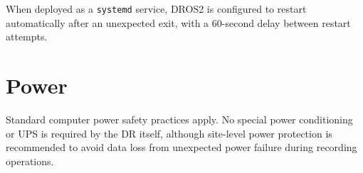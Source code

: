 When deployed as a \texttt{systemd} service, DROS2 is configured to restart
automatically after an unexpected exit, with a 60-second delay between restart
attempts.

\section{Power}
Standard computer power safety practices apply. No special power conditioning
or UPS is required by the DR itself, although site-level power protection is
recommended to avoid data loss from unexpected power failure during recording
operations.
